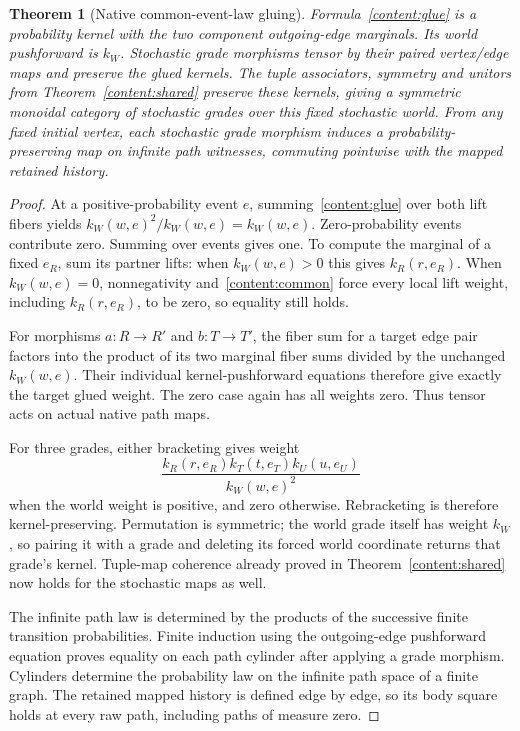 \documentclass[11pt]{article}
\newtheorem{theorem}{Theorem}[section]
\begin{document}
\begin{theorem}[Native common-event-law gluing]\label{content:stochastic}
Formula~\eqref{content:glue} is a probability kernel with the two component outgoing-edge marginals. Its world pushforward is $k_W$. Stochastic grade morphisms tensor by their paired vertex/edge maps and preserve the glued kernels. The tuple associators, symmetry and unitors from Theorem~\ref{content:shared} preserve these kernels, giving a symmetric monoidal category of stochastic grades over this fixed stochastic world. From any fixed initial vertex, each stochastic grade morphism induces a probability-preserving map on infinite path witnesses, commuting pointwise with the mapped retained history.
\end{theorem}
\begin{proof}
At a positive-probability event $e$, summing~\eqref{content:glue} over both lift fibers yields $k_W(w,e)^2/k_W(w,e)=k_W(w,e)$. Zero-probability events contribute zero. Summing over events gives one. To compute the marginal of a fixed $e_R$, sum its partner lifts: when $k_W(w,e)>0$ this gives $k_R(r,e_R)$. When $k_W(w,e)=0$, nonnegativity and~\eqref{content:common} force every local lift weight, including $k_R(r,e_R)$, to be zero, so equality still holds.

For morphisms $a:R\to R'$ and $b:T\to T'$, the fiber sum for a target edge pair factors into the product of its two marginal fiber sums divided by the unchanged $k_W(w,e)$. Their individual kernel-pushforward equations therefore give exactly the target glued weight. The zero case again has all weights zero. Thus tensor acts on actual native path maps.

For three grades, either bracketing gives weight
\[
 \frac{k_R(r,e_R)k_T(t,e_T)k_U(u,e_U)}{k_W(w,e)^2}
\]
when the world weight is positive, and zero otherwise. Rebracketing is therefore kernel-preserving. Permutation is symmetric; the world grade itself has weight $k_W$, so pairing it with a grade and deleting its forced world coordinate returns that grade's kernel. Tuple-map coherence already proved in Theorem~\ref{content:shared} now holds for the stochastic maps as well.

The infinite path law is determined by the products of the successive finite transition probabilities. Finite induction using the outgoing-edge pushforward equation proves equality on each path cylinder after applying a grade morphism. Cylinders determine the probability law on the infinite path space of a finite graph. The retained mapped history is defined edge by edge, so its body square holds at every raw path, including paths of measure zero.
\end{proof}
\end{document}
